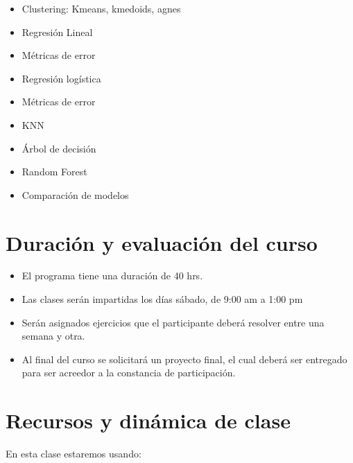\documentclass[
]{book}
\providecommand{\tightlist}{%
  \setlength{\itemsep}{0pt}\setlength{\parskip}{0pt}}
\begin{document}
\begin{itemize}
\tightlist
\item
  Clustering: Kmeans, kmedoids, agnes
\item
  Regresión Lineal
\item
  Métricas de error
\item
  Regresión logística
\item
  Métricas de error
\item
  KNN
\item
  Árbol de decisión
\item
  Random Forest
\item
  Comparación de modelos
\end{itemize}

\hypertarget{duraciuxf3n-y-evaluaciuxf3n-del-curso}{%
\section*{Duración y evaluación del curso}\label{duraciuxf3n-y-evaluaciuxf3n-del-curso}}

\begin{itemize}
\item
  El programa tiene una duración de 40 hrs.
\item
  Las clases serán impartidas los días sábado, de 9:00 am a 1:00 pm
\item
  Serán asignados ejercicios que el participante deberá resolver entre una semana y otra.
\item
  Al final del curso se solicitará un proyecto final, el cual deberá ser entregado para ser acreedor a la constancia de participación.
\end{itemize}

\hypertarget{recursos-y-dinuxe1mica-de-clase}{%
\section*{Recursos y dinámica de clase}\label{recursos-y-dinuxe1mica-de-clase}}

En esta clase estaremos usando:
\end{document}
